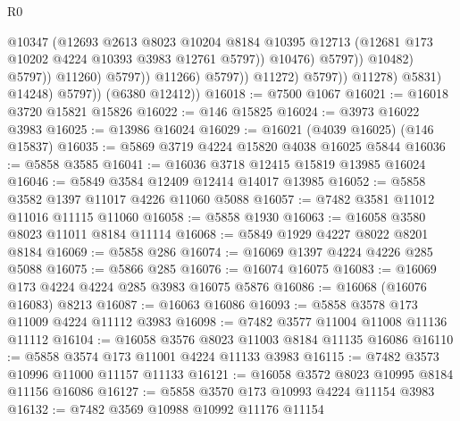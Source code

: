 \begin{lexlean}{R0}
\begin{coremodule}
                                              @10347
                                              (@12693
                                                @2613
                                                @8023
                                                @10204
                                                @8184
                                                @10395
                                                @12713
                                                (@12681
                                                  @173
                                                  @10202
                                                  @4224
                                                  @10393
                                                  @3983
                                                  @12761
                                                  @5797))
                                              @10476)
                                            @5797))
                                        @10482)
                                      @5797))
                                  @11260)
                                @5797))
                            @11266)
                          @5797))
                      @11272)
                    @5797))
                @11278)
              @5831)
            @14248)
          @5797))
      (@6380 @12412))
@16018 := @7500 @1067
@16021 := @16018 @3720 @15821 @15826
@16022 := @146 @15825
@16024 := @3973 @16022 @3983
@16025 := @13986 @16024
@16029 := @16021 (@4039 @16025) (@146 @15837)
@16035 := @5869 @3719 @4224 @15820 @4038 @16025 @5844
@16036 := @5858 @3585
@16041 := @16036 @3718 @12415 @15819 @13985 @16024
@16046 := @5849 @3584 @12409 @12414 @14017 @13985
@16052 := @5858 @3582 @1397 @11017 @4226 @11060 @5088
@16057 := @7482 @3581 @11012 @11016 @11115 @11060
@16058 := @5858 @1930
@16063 := @16058 @3580 @8023 @11011 @8184 @11114
@16068 := @5849 @1929 @4227 @8022 @8201 @8184
@16069 := @5858 @286
@16074 := @16069 @1397 @4224 @4226 @285 @5088
@16075 := @5866 @285
@16076 := @16074 @16075
@16083 := @16069 @173 @4224 @4224 @285 @3983 @16075 @5876
@16086 := @16068 (@16076 @16083) @8213
@16087 := @16063 @16086
@16093 := @5858 @3578 @173 @11009 @4224 @11112 @3983
@16098 := @7482 @3577 @11004 @11008 @11136 @11112
@16104 := @16058 @3576 @8023 @11003 @8184 @11135 @16086
@16110 := @5858 @3574 @173 @11001 @4224 @11133 @3983
@16115 := @7482 @3573 @10996 @11000 @11157 @11133
@16121 := @16058 @3572 @8023 @10995 @8184 @11156 @16086
@16127 := @5858 @3570 @173 @10993 @4224 @11154 @3983
@16132 := @7482 @3569 @10988 @10992 @11176 @11154

\end{coremodule}
\end{lexlean}

